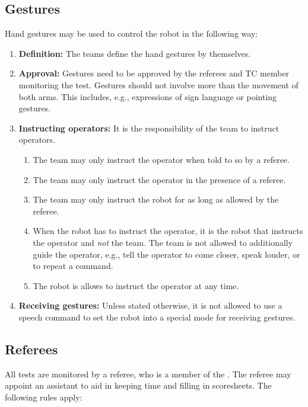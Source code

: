 \subsection{Gestures}
\label{rule:gestures}
Hand gestures may be used to control the robot in the following way:
\begin{enumerate}
	\item \textbf{Definition:} The teams define the hand gestures by themselves.

	\item \textbf{Approval:} Gestures need to be approved by the referees and TC member monitoring the test. Gestures should not involve more than the movement of both arms. This includes, e.g., expressions of sign language or pointing gestures.

	\item \textbf{Instructing operators:} It is the responsibility of the team to instruct operators.
	\begin{enumerate}
		\item The team may only instruct the operator when told to so by a referee.
		\item The team may only instruct the operator in the presence of a referee.
		\item The team may only instruct the robot for as long as allowed by the referee.
		\item When the robot has to instruct the operator, it is the robot that instructs the operator and \emph{not} the team. The team is not allowed to additionally guide the operator, e.g., tell the operator to come closer, speak louder, or to repeat a command.
		\item The robot is allows to instruct the operator at any time.
	\end{enumerate}

	\item \textbf{Receiving gestures:} Unless stated otherwise, it is not allowed to use a speech command to set the robot into a special mode for receiving gestures.
\end{enumerate}



\subsection{Referees}
\label{rule:referees}
All tests are monitored by a referee, who is a member of the . The referee may appoint an assistant to aid in keeping time and filling in scoresheets. 
The following rules apply:

